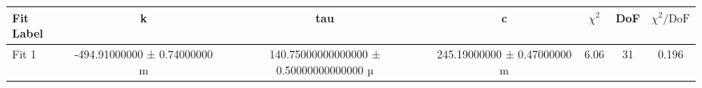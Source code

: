 \documentclass[a4paper]{article}
\begin{document}
    \begin{table}[htbp]
\centering
\begin{tabular}{|l|cccccc|}
\hline
Fit Label & k & tau & c & $\chi^2$ & DoF & $\chi^2/\text{DoF}$ \\\hline\hline
Fit 1 & -494.91000000 ± 0.74000000 m & 140.75000000000000 ± 0.50000000000000 µ & 245.19000000 ± 0.47000000 m & 6.06 & 31 & 0.196 \\\hline
\end{tabular}
\end{table}
\end{document}
